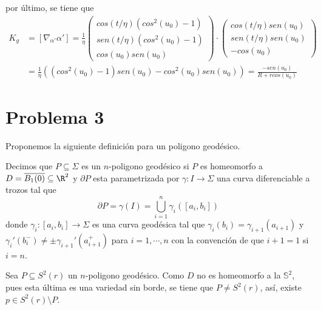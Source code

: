 \documentclass{article}
\begin{document}
por último, se tiene que
\begin{align*}
    K_{g} &= [\nabla_{\alpha'}\alpha']=\frac{1}{\eta}\begin{pmatrix}
        cos(t/\eta)(cos^{2}(u_{0})-1) \\ sen(t/\eta)(cos^{2}(u_{0})-1) \\ cos(u_{0})sen(u_{0})
    \end{pmatrix}\cdot\begin{pmatrix}
        cos(t/\eta)sen(u_{0}) \\ sen(t/\eta)sen(u_{0}) \\ -cos(u_{0})
    \end{pmatrix} \\[2mm]
    &= \frac{1}{\eta}\left((cos^{2}(u_{0})-1)sen(u_{0})-cos^{2}(u_{0})sen(u_{0})\right)
    =\frac{-sen(u_{0})}{R+rcos(u_{0})}
\end{align*}

\section*{Problema 3}
\noindent Proponemos la siguiente definición para un poligono geodésico.
\begin{dfn}
    Decimos que $P\subseteq\Sigma$ es un $n$-poligono geodésico si $P$ es homeomorfo a 
    $D=\overline{B_{1}(0)}\subseteq\R^{2}$ y $\partial P$ esta parametrizada por 
    $\gamma:I\to\Sigma$ una curva diferenciable a trozos tal que
    \begin{equation*}
        \partial P=\gamma(I)=\bigcup_{i=1}^{n}\gamma_{i}([a_{i},b_{i}])
    \end{equation*}
    donde $\gamma_{i}:[a_{i},b_{i}]\to\Sigma$ es una curva geodésica tal que $\gamma_{i}(b_{i})
    =\gamma_{i+1}(a_{i+1})$ y $\gamma_{i}'(b_{i}^{-})\neq\pm\gamma_{i+1}'(a_{i+1}^{+})$ para 
    $i=1,\cdots,n$ con la convención de que $i+1=1$ si $i=n$.
\end{dfn}

\noindent Sea $P\subseteq S^{2}(r)$ un $n$-poligono geodésico. Como $D$ no es homeomorfo a la 
$\mathbb{S}^{2}$, pues esta última es una variedad sin borde, se tiene que $P\neq S^{2}(r)$, así,
existe $p\in S^{2}(r)\setminus P$.
\end{document}
